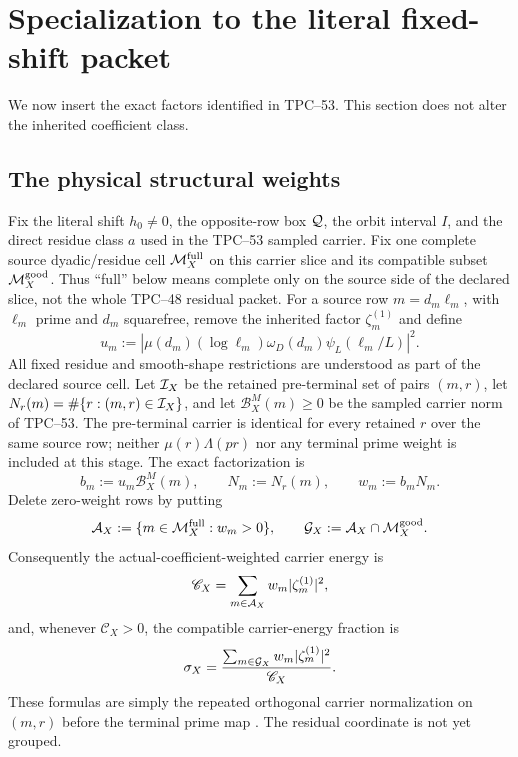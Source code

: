 \section{Specialization to the literal fixed-shift packet}
\label{sec:physical}

We now insert the exact factors identified in TPC--53.  This section does
not alter the inherited coefficient class.

\subsection{The physical structural weights}

Fix the literal shift \(h_0\ne0\), the opposite-row box \(\mathcal Q\), the
orbit interval \(I\), and the direct residue class \(a\) used in the
TPC--53 sampled carrier.  Fix one complete source dyadic/residue cell
\(\mathcal M_X^{\rm full}\) on this carrier slice and its compatible subset
\(\mathcal M_X^{\rm good}\).  Thus ``full'' below means complete only on the
source side of the declared slice, not the whole TPC--48 residual packet.
For a source row
\(m=d_m\ell_m\), with \(\ell_m\) prime and \(d_m\) squarefree, remove the
inherited factor \(\zeta_m^{(1)}\) and define
\begin{equation}
 u_m:=
 \left|
  \mu(d_m)(\log\ell_m)\omega_D(d_m)
  \psi_L(\ell_m/L)
 \right|^2.
 \label{eq:tpc54-source-base-weight}
\end{equation}
All fixed residue and smooth-shape restrictions are understood as part of
the declared source cell.  Let \(\mathcal I_X\) be the retained pre-terminal set
of pairs \((m,r)\), let
\(N_r(m)=\#\{r:(m,r)\in\mathcal I_X\}\), and let
\(\mathscr B_X^M(m)\ge0\) be the sampled carrier norm of TPC--53.  The
pre-terminal carrier is identical for every retained \(r\) over the same
source row; neither \(\mu(r)\Lambda(pr)\) nor any terminal prime weight is
included at this stage.  The exact factorization is
\begin{equation}
 b_m:=u_m\mathscr B_X^M(m),
 \qquad N_m:=N_r(m),
 \qquad w_m:=b_mN_m.
 \label{eq:tpc54-literal-w}
\end{equation}
Delete zero-weight rows by putting
\begin{equation}
 \mathcal A_X:=\{m\in\mathcal M_X^{\rm full}:w_m>0\},
 \qquad \mathcal G_X:=\mathcal A_X\cap\mathcal M_X^{\rm good}.
 \label{eq:tpc54-active-source}
\end{equation}
Consequently the actual-coefficient-weighted carrier energy is
\begin{equation}
 \mathscr C_X
 =\sum_{m\in\mathcal A_X}
   w_m|\zeta_m^{(1)}|^2,
 \label{eq:tpc54-literal-energy}
\end{equation}
and, whenever \(\mathscr C_X>0\), the compatible carrier-energy fraction is
\begin{equation}
 \sigma_X
 =\frac{
   \sum_{m\in\mathcal G_X}w_m|\zeta_m^{(1)}|^2}
  {\mathscr C_X}.
 \label{eq:tpc54-literal-sigma}
\end{equation}
These formulas are simply the repeated orthogonal carrier normalization
on \((m,r)\) before the terminal prime map
\citep{WangTPC52,WangTPC53}.  The residual coordinate is not yet grouped.

